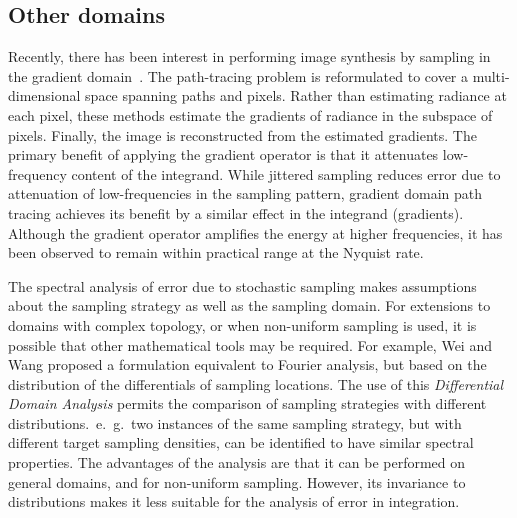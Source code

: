 %
%
%
\subsection{Other domains}

Recently, there has been interest in performing image synthesis by sampling in the gradient domain~\cite{Kettunen2015sg}. The path-tracing problem is reformulated to cover a multi-dimensional space spanning paths and pixels. Rather than estimating radiance at each pixel, these methods estimate the gradients of radiance in the subspace of pixels. Finally, the image is reconstructed from the estimated gradients. The primary benefit of applying the gradient operator is that it attenuates low-frequency content of the integrand. While jittered sampling reduces error due to attenuation of low-frequencies in the sampling pattern, gradient domain path tracing achieves its benefit by a similar effect in the integrand (gradients).  Although the gradient operator amplifies the energy at higher frequencies, it has been observed to remain within practical range at the Nyquist rate.

The spectral analysis of error due to stochastic sampling makes assumptions about the sampling strategy as well as the sampling domain. For extensions to domains with complex topology, or when non-uniform sampling is used, it is possible that other mathematical tools may be required. For example, Wei and Wang \cite{export:147066} proposed a formulation equivalent to Fourier analysis, but based on the distribution of the differentials of sampling locations. The use of this \textit{Differential Domain Analysis} permits the comparison of sampling strategies with different distributions.~e.~g.~two instances of the same sampling strategy, but with different target sampling densities, can be identified to have similar spectral properties. The advantages of the analysis are that it can be performed on general domains, and for non-uniform sampling. However, its invariance to distributions makes it less suitable for the analysis of error in integration. 

  
%
%

%
%
%
